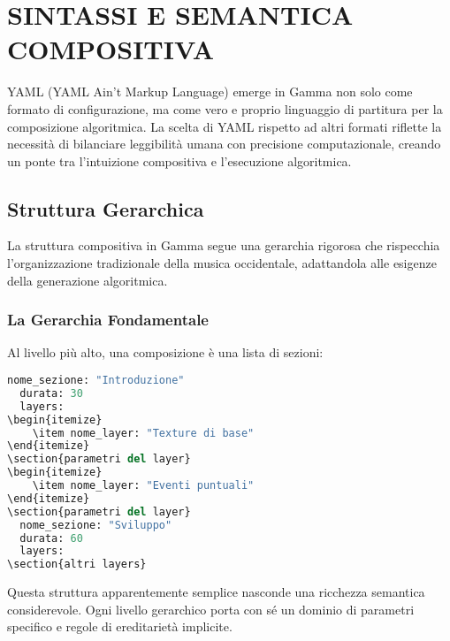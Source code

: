 
\section{SINTASSI E SEMANTICA COMPOSITIVA}
YAML (YAML Ain't Markup Language) emerge in Gamma non solo come formato di configurazione, ma come vero e proprio linguaggio di partitura per la composizione algoritmica. La scelta di YAML rispetto ad altri formati riflette la necessità di bilanciare leggibilità umana con precisione computazionale, creando un ponte tra l'intuizione compositiva e l'esecuzione algoritmica.
\subsection{Struttura Gerarchica}
La struttura compositiva in Gamma segue una gerarchia rigorosa che rispecchia l'organizzazione tradizionale della musica occidentale, adattandola alle esigenze della generazione algoritmica.
\subsubsection{La Gerarchia Fondamentale}
Al livello più alto, una composizione è una lista di sezioni:

\begin{lstlisting}[language=Python]
  nome_sezione: "Introduzione"
  durata: 30
  layers:
\begin{itemize}
    \item nome_layer: "Texture di base"
\end{itemize}
\section{parametri del layer}
\begin{itemize}
    \item nome_layer: "Eventi puntuali"
\end{itemize}
\section{parametri del layer}
  nome_sezione: "Sviluppo"
  durata: 60
  layers:
\section{altri layers}
\end{lstlisting}

Questa struttura apparentemente semplice nasconde una ricchezza semantica considerevole. Ogni livello gerarchico porta con sé un dominio di parametri specifico e regole di ereditarietà implicite.
